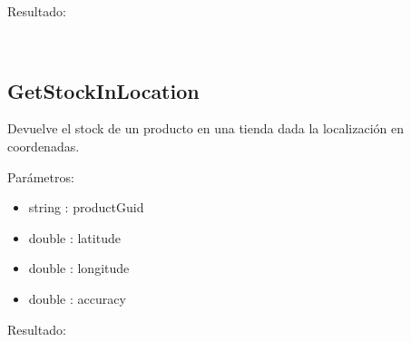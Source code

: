 Resultado:
\begin{lstlisting}
	
\end{lstlisting}

\subsection{GetStockInLocation}
Devuelve el stock de un producto en una tienda dada la localización en coordenadas.

Parámetros:
\begin{itemize}
	\item string : productGuid
	\item double : latitude
	\item double : longitude
	\item double : accuracy
\end{itemize}

Resultado:
\begin{lstlisting}
	
\end{lstlisting}
\chapterend